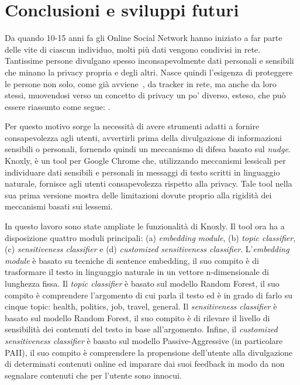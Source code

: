 \chapter{Conclusioni e sviluppi futuri}
\label{ch:cap7}
Da quando 10-15 anni fa gli Online Social Network hanno iniziato a far parte delle vite di ciascun individuo, molti più dati vengono condivisi in rete. Tantissime persone divulgano spesso inconsapevolmente dati personali e sensibili che minano la privacy propria e degli altri. Nasce quindi l'esigenza di proteggere le persone non solo, come già avviene~\cite{}, da tracker in rete, ma anche da loro stessi, muovendosi verso un concetto di privacy un po' diverso, esteso, che può essere riassunto come segue: \textit{ }.

Per questo motivo sorge la necessità di avere strumenti adatti a fornire consapevolezza agli utenti, avvertirli prima della divulgazione di informazioni sensibili o personali, fornendo quindi un meccanismo di difesa basato sul \textit{nudge}. Knoxly, è un tool per Google Chrome che, utilizzando meccanismi lessicali per individuare dati sensibili e personali in messaggi di testo scritti in linguaggio naturale, fornisce agli utenti consapevolezza rispetto alla privacy. Tale tool nella sua prima versione mostra delle limitazioni dovute proprio alla rigidità dei meccanismi basati sui lessemi. 

In questo lavoro sono state ampliate le funzionalità di Knoxly. Il tool ora ha a disposizione quattro moduli  principali: (a) \textit{embedding module}, (b) \textit{topic classifier}, (c) \textit{sensitiveness classifier} e (d) \textit{customized sensitiveness classifier}. L'\textit{embedding module} è basato su tecniche di sentence embedding, il suo compito è di trasformare il testo in linguaggio naturale in un vettore n-dimensionale di lunghezza fissa. Il \textit{topic classifier} è basato sul modello Random Forest, il suo compito è comprendere l'argomento di cui parla il testo ed è in grado di farlo su cinque topic: health, politics, job, travel, general. Il \textit{sensitiveness classifier} è basato sul modello Random Forest, il suo compito è di rilevare il livello di sensibilità dei contenuti del testo in base all'argomento. Infine, il \textit{customized sensitiveness classifier} è basato sul modello Passive-Aggressive (in particolare PAII), il suo compito è comprendere la propensione dell'utente alla divulgazione di determinati contenuti online ed imparare dai suoi feedback in modo da non segnalare contenuti che per l'utente sono innocui. 

